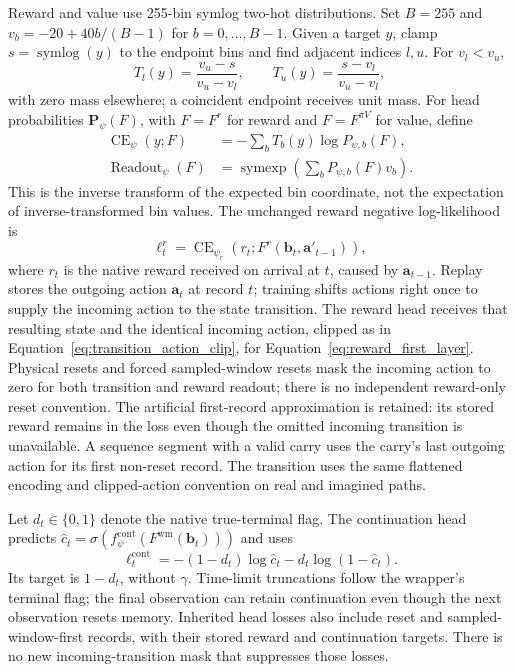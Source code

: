 \documentclass{article}
\begin{document}
Reward and value use 255-bin symlog two-hot distributions. Set $B=255$ and $v_b=-20+40b/(B-1)$ for $b=0,\ldots,B-1$. Given a target $y$, clamp $s=\operatorname{symlog}(y)$ to the endpoint bins and find adjacent indices $l,u$. For $v_l<v_u$,
\begin{equation}
T_l(y)=\frac{v_u-s}{v_u-v_l},\qquad
T_u(y)=\frac{s-v_l}{v_u-v_l},
\label{eq:twohot_target}
\end{equation}
with zero mass elsewhere; a coincident endpoint receives unit mass. For head probabilities $\mathbf P_\psi(F)$, with $F=F^r$ for reward and $F=F^{\pi V}$ for value, define
\begin{align}
\operatorname{CE}_\psi(y;F)&=-\sum_b T_b(y)\log P_{\psi,b}(F),
\label{eq:twohot_loss}\\
\operatorname{Readout}_\psi(F)&=\operatorname{symexp}\!\left(\sum_bP_{\psi,b}(F)v_b\right).
\label{eq:twohot_readout}
\end{align}
This is the inverse transform of the expected bin coordinate, not the expectation of inverse-transformed bin values. The unchanged reward negative log-likelihood is
\begin{equation}
\ell_t^r=\operatorname{CE}_{\psi_r}
(r_t;F^r(\mathbf b_t,\mathbf a'_{t-1})),
\label{eq:nrsm_reward_loss}
\end{equation}
where $r_t$ is the native reward received on arrival at $t$, caused by $\mathbf a_{t-1}$. Replay stores the outgoing action $\mathbf a_t$ at record $t$; training shifts actions right once to supply the incoming action to the state transition. The reward head receives that resulting state and the identical incoming action, clipped as in Equation~\eqref{eq:transition_action_clip}, for Equation~\eqref{eq:reward_first_layer}. Physical resets and forced sampled-window resets mask the incoming action to zero for both transition and reward readout; there is no independent reward-only reset convention. The artificial first-record approximation is retained: its stored reward remains in the loss even though the omitted incoming transition is unavailable. A sequence segment with a valid carry uses the carry's last outgoing action for its first non-reset record. The transition uses the same flattened encoding and clipped-action convention on real and imagined paths.

Let $d_t\in\{0,1\}$ denote the native true-terminal flag. The continuation head predicts $\hat c_t=\sigma(f^{\mathrm{cont}}_\psi(F^{\mathrm{wm}}(\mathbf b_t)))$ and uses
\begin{equation}
\ell_t^{\mathrm{cont}}=-(1-d_t)\log\hat c_t-d_t\log(1-\hat c_t).
\label{eq:nrsm_done_loss}
\end{equation}
Its target is $1-d_t$, without $\gamma$. Time-limit truncations follow the wrapper's terminal flag; the final observation can retain continuation even though the next observation resets memory. Inherited head losses also include reset and sampled-window-first records, with their stored reward and continuation targets. There is no new incoming-transition mask that suppresses those losses.
\end{document}
